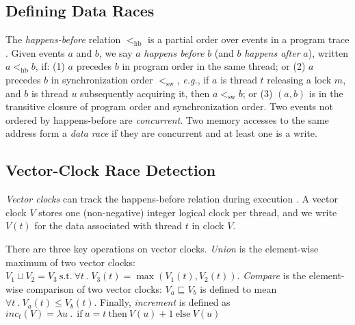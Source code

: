 \documentclass[preprint, 10pt]{sigplanconf}
\newcommand{\eg}{\textit{e.g.}\xspace}
\newcommand{\hb}[0]{<_{\mathrm{hb}}}
\newcommand{\sw}[0]{<_{\mathrm{sw}}}
\newcommand{\Tid}{t}
\newcommand{\TidU}{u}
\newcommand{\Lock}{m}
\newcommand{\VC}{V}
\newcommand{\SuchThat}{\ \text{s.t.}\ }
\newcommand{\Bind}{\ .\ }
\newcommand{\VCMax}{\sqcup}
\newcommand{\VCCompare}{\sqsubseteq}
\begin{document}
\subsection{Defining Data Races}

The \emph{happens-before} relation $\hb$ is a partial order over events in a
program trace \cite{lamport-hb}.  Given events $a$ and $b$, we say $a$
\emph{happens before} $b$ (and $b$ \emph{happens after} $a$), written $a \hb b$,
if: (1) $a$ precedes $b$ in program order in the same thread; or (2) $a$
precedes $b$ in synchronization order $\sw$, \eg, if $a$ is thread $\Tid$ releasing a lock $\Lock$, and $b$ is thread $\TidU$ subsequently acquiring it, then $a \sw b$; or (3) $(a,b)$ is in the
transitive closure of program order and synchronization order.
Two events not ordered by happens-before are \emph{concurrent}.  Two
memory accesses to the same address form a \emph{data race} if they are
concurrent and at least one is a write.

\subsection{Vector-Clock Race Detection}
\label{vector-clocks}

\emph{Vector clocks} can track the happens-before relation during
execution \cite{fidge-vc,mattern-vc}.  A vector clock $\VC$ stores one (non-negative) integer
logical clock per thread, and we write $\VC(\Tid)$ for the data associated with thread $\Tid$ in clock $\VC$.

  There are three key operations on vector clocks.
\emph{Union} is the element-wise maximum of two vector clocks:
$\VC_1 \VCMax \VC_2 = \VC_3 \SuchThat \forall \Tid \Bind \VC_3(\Tid) =
\max(\VC_1(\Tid), \VC_2(\Tid))$. \emph{Compare} is the element-wise
comparison of two vector clocks: $\VC_a \VCCompare \VC_b$ is defined to mean $\forall
\Tid \Bind \VC_a(\Tid) \leq \VC_b(\Tid)$.  Finally, \emph{increment} is defined as $inc_t(V) = \lambda u \Bind \mathrm{~if~} u=t \mathrm{~then~} V(u)+1 \mathrm{~else~} V(u)$
\end{document}
